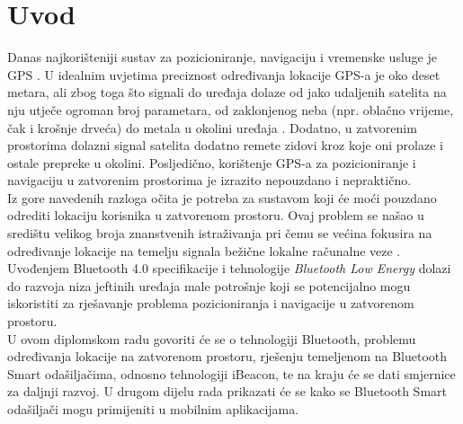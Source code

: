 \chapter{Uvod}

Danas najkorišteniji sustav za pozicioniranje, navigaciju i vremenske usluge je GPS . %
U idealnim uvjetima preciznost određivanja lokacije GPS-a je oko deset metara, ali zbog toga što signali do uređaja dolaze od jako udaljenih satelita na nju utječe ogroman broj parametara, od zaklonjenog neba (npr. oblačno vrijeme, čak i krošnje drveća) do metala u okolini uređaja \citep{schneider2013}.
Dodatno, u zatvorenim prostorima dolazni signal satelita dodatno remete zidovi kroz koje oni prolaze i ostale prepreke u okolini.
Posljedično, korištenje GPS-a za pozicioniranje i navigaciju u zatvorenim prostorima je izrazito nepouzdano i nepraktično.
\\

Iz gore navedenih razloga očita je potreba za sustavom koji će moći pouzdano odrediti lokaciju korisnika u zatvorenom prostoru. 
Ovaj problem se našao u središtu velikog broja znanstvenih istraživanja pri čemu se većina fokusira na određivanje lokacije na temelju signala bežične lokalne računalne veze . %
Uvođenjem Bluetooth 4.0 specifikacije i tehnologije \textit{Bluetooth Low Energy} dolazi do razvoja niza jeftinih uređaja male potrošnje koji se potencijalno mogu iskoristiti za rješavanje problema pozicioniranja i navigacije u zatvorenom prostoru.
\\

U ovom diplomskom radu govoriti će se o tehnologiji Bluetooth, problemu određivanja lokacije na zatvorenom prostoru, rješenju temeljenom na Bluetooth Smart odašiljačima, odnosno tehnologiji iBeacon, te na kraju će se dati smjernice za daljnji razvoj. 
U drugom dijelu rada prikazati će se kako se Bluetooth Smart odašiljači mogu primijeniti u mobilnim aplikacijama.